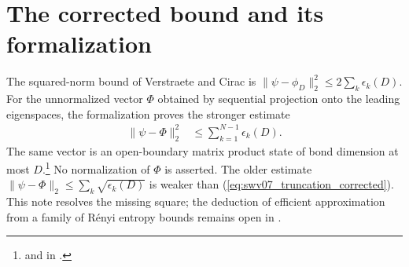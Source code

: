\documentclass{article}
\begin{document}
\section{The corrected bound and its formalization}

The squared-norm bound of Verstraete and Cirac is
$\|\psi-\phi_D\|_2^2\le2\sum_k\epsilon_k(D)$.
For the unnormalized vector $\Phi$ obtained by sequential projection onto
the leading eigenspaces, the formalization proves the stronger estimate
\begin{align}
    \|\psi-\Phi\|_2^2 &\le\sum_{k=1}^{N-1}\epsilon_k(D).
    \label{eq:swv07_truncation_corrected}
\end{align}
The same vector is an open-boundary matrix product state of bond dimension
at most $D$.\footnote{
    and 
    in .}
No normalization of $\Phi$ is asserted. The older estimate
$\|\psi-\Phi\|_2\le\sum_k\sqrt{\epsilon_k(D)}$ is weaker than
(\ref{eq:swv07_truncation_corrected}).
This note resolves the missing square; the deduction of efficient
approximation from a family of R\'enyi entropy bounds remains open in
.



\end{document}
